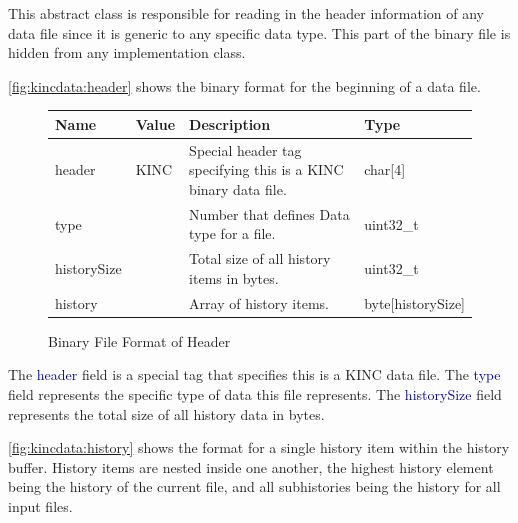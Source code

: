 \documentclass[10pt]{article}
\providecommand{\h}[1]{\textcolor{darkblue}{#1}}
\begin{document}
This abstract class is responsible for reading in the header information of any 
data file since it is generic to any specific data type. This part of the 
binary file is hidden from any implementation class.

\autoref{fig:kincdata:header} shows the binary format for the beginning 
of a data file.

\begin{figure}[H]
\begin{mdframed}[style=btable]
\begin{tabularx}{\textwidth}{|l|l|X|l|}
\hline
\textbf{Name} & \textbf{Value} & \textbf{Description} & \textbf{Type} \\
\hline
header & KINC & Special header tag specifying this is a KINC binary data file. 
& char[4] \\
\hline
type & & Number that defines Data type for a file. & uint32\_t \\
\hline
historySize & & Total size of all history items in bytes. & uint32\_t \\
\hline
history & & Array of history items. & byte[historySize] \\
\hline
\end{tabularx}
\end{mdframed}
\caption{Binary File Format of Header}
\label{fig:kincdata:header}
\end{figure}

The \h{header} field is a special tag that specifies this is a KINC data file. 
The \h{type} field represents the specific type of data this file represents. 
The \h{historySize} field represents the total size of all history data in 
bytes.

\autoref{fig:kincdata:history} shows the format for a single history item 
within the history buffer. History items are nested inside one another, the 
highest history element being the history of the current file, and all 
subhistories being the history for all input files.
\end{document}
